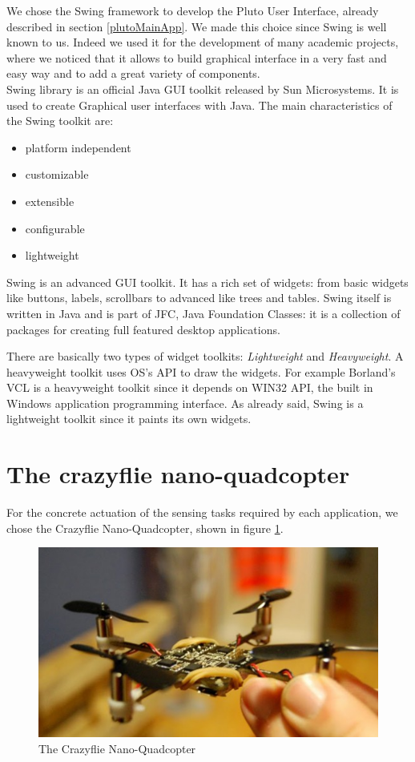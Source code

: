 We chose the Swing framework to develop the Pluto User Interface, already described in section \ref{plutoMainApp}.
We made this choice since Swing is well known to us.
Indeed we used it for the development of many academic projects, where we noticed that it allows to build graphical interface in a very fast and easy way and to add a great variety of components.
\\

Swing library is an official Java GUI toolkit released by Sun Microsystems. It is used to create Graphical user interfaces with Java.
The main characteristics of the Swing toolkit are:
\begin{itemize}
\item platform independent
\item customizable
\item extensible
\item configurable
\item lightweight
\end{itemize}

Swing is an advanced GUI toolkit. It has a rich set of widgets:
from basic widgets like buttons, labels, scrollbars to advanced like trees and tables. 
Swing itself is written in Java and is part of JFC, Java Foundation Classes: it is a collection of packages for creating full featured desktop applications.

There are basically two types of widget toolkits: \textit{Lightweight} and \textit{Heavyweight}.
A heavyweight toolkit uses OS's API to draw the widgets. For example Borland's VCL is a heavyweight toolkit since it depends on WIN32 API, the built in Windows application programming interface.
As already said, Swing is a lightweight toolkit since it paints its own widgets.

\section{The crazyflie nano-quadcopter}\label{crazyflie}

For the concrete actuation of the sensing tasks required by each application, we chose the Crazyflie Nano-Quadcopter, shown in figure \ref{fig:crazyflie}.


\begin{figure}[H]
\centering
\includegraphics[width=\linewidth]
{pictures/crazyflie.jpg}
  \caption{The Crazyflie Nano-Quadcopter}
  \label{fig:crazyflie}
\end{figure}

